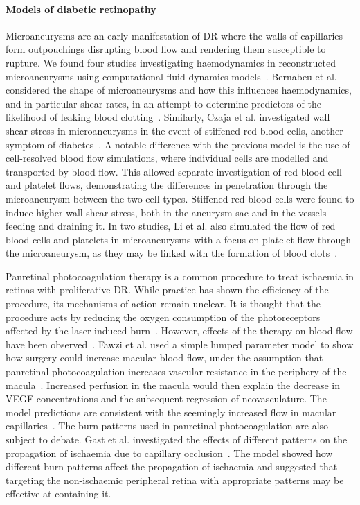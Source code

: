 \documentclass{article}
\begin{document}
\paragraph*{Models of diabetic retinopathy}

Microaneurysms are an early manifestation of DR where the walls of capillaries form outpouchings disrupting blood flow and rendering them susceptible to rupture.
We found four studies investigating haemodynamics in reconstructed microaneurysms using computational fluid dynamics models~\cite{Bernabeu_2018,Czaja_2022,Li_2020,Li_2022}.
Bernabeu et al. considered the shape of microaneurysms and how this influences haemodynamics, and in particular shear rates, in an attempt to determine predictors of the likelihood of leaking blood clotting~\cite{Bernabeu_2018}.
Similarly, Czaja et al. investigated wall shear stress in microaneurysms in the event of stiffened red blood cells, another symptom of diabetes~\cite{Czaja_2022}.
A notable difference with the previous model is the use of cell-resolved blood flow simulations, where individual cells are modelled and transported by blood flow.
This allowed separate investigation of red blood cell and platelet flows, demonstrating the differences in penetration through the microaneurysm between the two cell types.
Stiffened red blood cells were found to induce higher wall shear stress, both in the aneurysm sac and in the vessels feeding and draining it.
In two studies, Li et al. also simulated the flow of red blood cells and platelets in microaneurysms with a focus on platelet flow through the microaneurysm, as they may be linked with the formation of blood clots~\cite{Li_2020,Li_2022}.

Panretinal photocoagulation therapy is a common procedure to treat ischaemia in retinas with proliferative DR.
While practice has shown the efficiency of the procedure, its mechanisms of action remain unclear.
It is thought that the procedure acts by reducing the oxygen consumption of the photoreceptors affected by the laser-induced burn~\cite{Fawzi_2019,Gast_2016}.
However, effects of the therapy on blood flow have been observed~\cite{Fawzi_2019}.
Fawzi et al. used a simple lumped parameter model to show how surgery could increase macular blood flow, under the assumption that panretinal photocoagulation increases vascular resistance in the periphery of the macula~\cite{Fawzi_2019}.
Increased perfusion in the macula would then explain the decrease in VEGF concentrations and the subsequent regression of neovasculature.
The model predictions are consistent with the seemingly increased flow in macular capillaries~\cite{Fawzi_2019}.
The burn patterns used in panretinal photocoagulation are also subject to debate.
Gast et al. investigated the effects of different patterns on the propagation of ischaemia due to capillary occlusion~\cite{Gast_2016}.
The model showed how different burn patterns affect the propagation of ischaemia and suggested that targeting the non-ischaemic peripheral retina with appropriate patterns may be effective at containing it.
\end{document}
